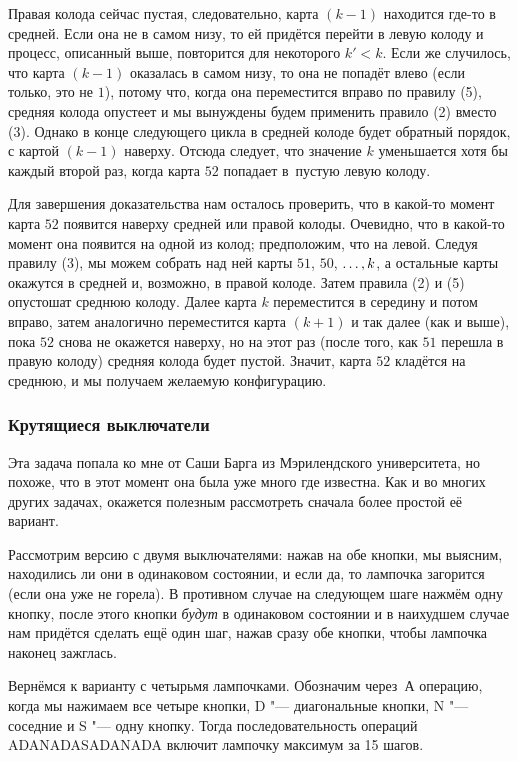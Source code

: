 \documentclass[twoside]{book}
\begin{document}
Правая колода сейчас пустая, следовательно,  карта $(k-1)$ находится где-то в средней.
Если она не в самом низу, то ей придётся перейти в левую колоду и процесс, описанный выше, повторится для некоторого $k'<k$.
Если же случилось, что карта $(k-1)$ оказалась в самом низу, то она не попадёт влево (если только, это не $1$), потому что, когда она переместится вправо по правилу (5), средняя колода опустеет и мы вынуждены будем применить правило (2) вместо (3).
Однако в конце следующего цикла в средней колоде будет обратный порядок, с картой $(k-1)$ наверху.
Отсюда следует, что значение $k$ уменьшается хотя бы каждый второй раз, когда карта $52$ попадает в~пустую левую колоду.

Для завершения доказательства нам осталось проверить, что в какой-то момент карта $52$ появится наверху средней или правой колоды.
Очевидно, что в какой-то момент она появится на одной из колод;
предположим, что на левой.
Следуя правилу (3), мы можем собрать над ней карты $51$, $50$, $\z\dots, k$, а остальные карты окажутся в средней и, возможно, в правой колоде.
Затем правила (2) и (5) опустошат среднюю колоду.
Далее карта $k$ переместится в середину и потом вправо, затем аналогично переместится карта $(k+1)$ и так далее (как и выше), пока $52$ снова не окажется наверху, но на этот раз (после того, как $51$ перешла в правую колоду) средняя колода будет пустой.
Значит, карта $52$ кладётся на среднюю, и мы получаем желаемую конфигурацию.

\subsubsection*{Крутящиеся выключатели}%

Эта задача попала ко мне от Саши Барга из Мэрилендского университета, но похоже, что в этот момент она была уже много где известна.
Как и во многих других задачах, окажется полезным рассмотреть сначала более простой её вариант.

\medskip

Рассмотрим версию с двумя выключателями: нажав на обе кнопки, мы выясним, находились ли они в одинаковом состоянии, и если да, то лампочка загорится (если она уже не горела).
В противном случае на следующем шаге нажмём одну кнопку, после этого кнопки \emph{будут} в одинаковом состоянии и в наихудшем случае нам придётся сделать ещё один шаг, нажав сразу обе кнопки, чтобы лампочка наконец зажглась.

Вернёмся к варианту с четырьмя лампочками.
Обозначим через~А операцию, когда мы нажимаем все четыре кнопки, 
D "--- диагональные кнопки, 
N "--- соседние и 
S "--- одну кнопку.
Тогда последовательность операций ADANADASADANADA включит лампочку максимум за 15 шагов. %
\end{document}
